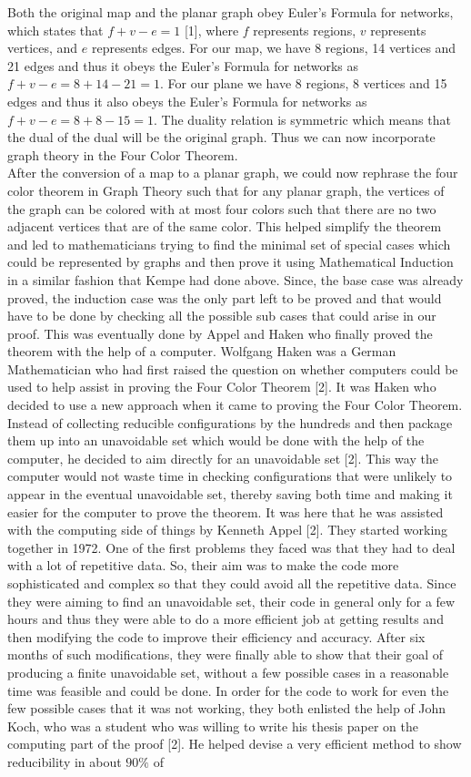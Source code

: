 \documentclass[11pt]{article}
\newcommand{\forceindent}{\leavevmode{\parindent=1.5em\indent}}
\begin{document}
 Both the original map and the planar graph obey Euler's Formula for networks, which states that $f+v-e = 1$ [1], where $f$ represents regions, $v$ represents vertices, and $e$ represents edges. For our map, we have 8 regions, 14 vertices and 21 edges and thus it obeys the Euler's Formula for networks as $f+v-e = 8 + 14 - 21 = 1$. For our plane we have 8 regions, 8 vertices and 15 edges and thus it also obeys the Euler's Formula for networks as $f+v-e = 8 + 8 - 15 = 1$. The duality relation is symmetric which means that the dual of the dual will be the original graph. Thus we can now incorporate graph theory in the Four Color Theorem.\\
  \forceindent After the conversion of a map to a planar graph, we could now rephrase the four color theorem in Graph Theory such that for any planar graph, the vertices of the graph can be colored with at most four colors such that there are no two adjacent vertices that are of the same color. This helped simplify the theorem and led to mathematicians trying to find the minimal set of special cases which could be represented by graphs and then prove it using Mathematical Induction in a similar fashion that Kempe had done above. Since, the base case was already proved, the induction case was the only part left to be proved and that would have to be done by checking all the possible sub cases that could arise in our proof. This was eventually done by Appel and Haken who finally proved the theorem with the help of a computer. Wolfgang Haken was a German Mathematician who had first raised the question on whether computers could be used to help assist in proving the Four Color Theorem [2]. It was Haken who decided to use a new approach when it came to proving the Four Color Theorem. Instead of collecting reducible configurations by the hundreds and then package them up into an unavoidable set which would be done with the help of the computer, he decided to aim directly for an unavoidable set [2]. This way the computer would not waste time in checking configurations that were unlikely to appear in the eventual unavoidable set, thereby saving both time and making it easier for the computer to prove the theorem. It was here that he was assisted with the computing side of things by Kenneth Appel [2]. They started working together in 1972. One of the first problems they faced was that they had to deal with a lot of repetitive data. So, their aim was to make the code more sophisticated and complex so that they could avoid all the repetitive data. Since they were aiming to find an unavoidable set, their code in general only for a few hours and thus they were able to do a more efficient job at getting results and then modifying the code to improve their efficiency and accuracy. After six months of such modifications, they were finally able to show that their goal of producing a finite unavoidable set, without a few possible cases in a reasonable time was feasible and could be done. In order for the code to work for even the few possible cases that it was not working, they both enlisted the help of John Koch, who was a student who was willing to write his thesis paper on the computing part of the proof [2]. He helped devise a very efficient method to show reducibility in about $90 \%$  of 
\end{document}
